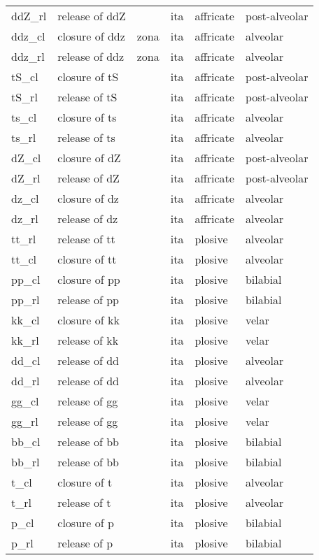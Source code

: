 {\begin{longtable}{l|p{.3\linewidth}|p{.15\linewidth}|l|p{.15\linewidth}|l}
	ddZ\_rl	& release of ddZ	& 	& ita	& affricate	& post-alveolar	\\
	ddz\_cl	& closure of ddz	& zona	& ita	& affricate	& alveolar	\\
	ddz\_rl	& release of ddz	& zona	& ita	& affricate	& alveolar	\\
	tS\_cl	& closure of tS	& 	& ita	& affricate	& post-alveolar	\\
	tS\_rl	& release of tS	& 	& ita	& affricate	& post-alveolar	\\
	ts\_cl	& closure of ts	& 	& ita	& affricate	& alveolar	\\
	ts\_rl	& release of ts	& 	& ita	& affricate	& alveolar	\\
	dZ\_cl	& closure of dZ	& 	& ita	& affricate	& post-alveolar	\\
	dZ\_rl	& release of dZ	& 	& ita	& affricate	& post-alveolar	\\
	dz\_cl	& closure of dz	& 	& ita	& affricate	& alveolar	\\
	dz\_rl	& release of dz	& 	& ita	& affricate	& alveolar	\\
	tt\_rl	& release of tt	& 	& ita	& plosive	& alveolar	\\
	tt\_cl	& closure of tt	& 	& ita	& plosive	& alveolar	\\
	pp\_cl	& closure of pp	& 	& ita	& plosive	& bilabial	\\
	pp\_rl	& release of pp	& 	& ita	& plosive	& bilabial	\\
	kk\_cl	& closure of kk	& 	& ita	& plosive	& velar	\\
	kk\_rl	& release of kk	& 	& ita	& plosive	& velar	\\
	dd\_cl	& release of dd	& 	& ita	& plosive	& alveolar	\\
	dd\_rl	& release of dd	& 	& ita	& plosive	& alveolar	\\
	gg\_cl	& release of gg	& 	& ita	& plosive	& velar	\\
	gg\_rl	& release of gg	& 	& ita	& plosive	& velar	\\
	bb\_cl	& release of bb	& 	& ita	& plosive	& bilabial	\\
	bb\_rl	& release of bb	& 	& ita	& plosive	& bilabial	\\
	t\_cl	& closure of t	& 	& ita	& plosive	& alveolar	\\
	t\_rl	& release of t	& 	& ita	& plosive	& alveolar	\\
	p\_cl	& closure of p	& 	& ita	& plosive	& bilabial	\\
	p\_rl	& release of p	& 	& ita	& plosive	& bilabial	\\

\end{longtable}}
